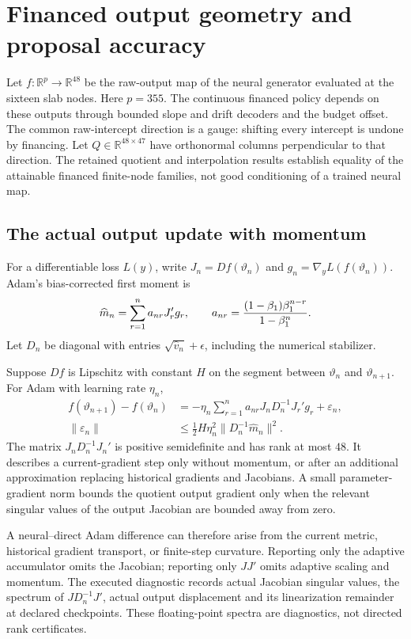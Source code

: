 \section{Financed output geometry and proposal accuracy}\label{sec:r24geometry}
Let $f:\mathbb R^p\to\mathbb R^{48}$ be the raw-output map of the neural generator evaluated at the sixteen slab nodes. Here $p=355$. The continuous financed policy depends on these outputs through bounded slope and drift decoders and the budget offset. The common raw-intercept direction is a gauge: shifting every intercept is undone by financing. Let $Q\in\mathbb R^{48\times47}$ have orthonormal columns perpendicular to that direction. The retained quotient and interpolation results establish equality of the attainable financed finite-node families, not good conditioning of a trained neural map.

\subsection{The actual output update with momentum}
For a differentiable loss $L(y)$, write $J_n=Df(\vartheta_n)$ and $g_n=\nabla_yL(f(\vartheta_n))$. Adam's bias-corrected first moment is
\[
 \widehat m_n=\sum_{r=1}^{n}a_{nr}J_r'g_r,\qquad
 a_{nr}={(1-\beta_1)\beta_1^{n-r}\over1-\beta_1^n}.
\]
Let $D_n$ be diagonal with entries $\sqrt{\widehat v_n}+\epsilon$, including the numerical stabilizer.
\begin{theorem}\label{thm:r24transport}
Suppose $Df$ is Lipschitz with constant $H$ on the segment between $\vartheta_n$ and $\vartheta_{n+1}$. For Adam with learning rate $\eta_n$,
\begin{align}
 f(\vartheta_{n+1})-f(\vartheta_n)
 &=-\eta_n\sum_{r=1}^na_{nr}J_nD_n^{-1}J_r'g_r+\varepsilon_n,\label{eq:r24transport}\\
 \|\varepsilon_n\|&\leq\tfrac12H\eta_n^2\|D_n^{-1}\widehat m_n\|^2.\label{eq:r24remainder}
\end{align}
The matrix $J_nD_n^{-1}J_n'$ is positive semidefinite and has rank at most $48$. It describes a current-gradient step only without momentum, or after an additional approximation replacing historical gradients and Jacobians. A small parameter-gradient norm bounds the quotient output gradient only when the relevant singular values of the output Jacobian are bounded away from zero.
\end{theorem}
A neural--direct Adam difference can therefore arise from the current metric, historical gradient transport, or finite-step curvature. Reporting only the adaptive accumulator omits the Jacobian; reporting only $JJ'$ omits adaptive scaling and momentum. The executed diagnostic records actual Jacobian singular values, the spectrum of $JD_n^{-1}J'$, actual output displacement and its linearization remainder at declared checkpoints. These floating-point spectra are diagnostics, not directed rank certificates.


